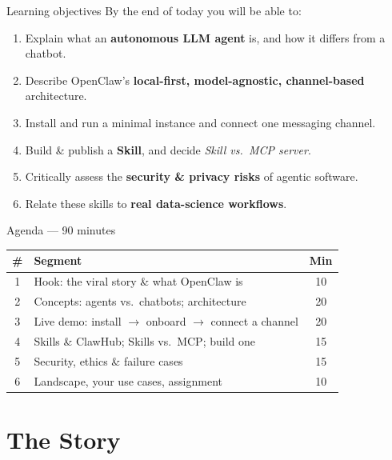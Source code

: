 \documentclass[aspectratio=169,11pt]{beamer}
\begin{document}
\begin{frame}{Learning objectives}
  By the end of today you will be able to:
  \begin{enumerate}
    \item Explain what an \textbf{autonomous LLM agent} is, and how it differs from a chatbot.
    \item Describe OpenClaw's \textbf{local-first, model-agnostic, channel-based} architecture.
    \item Install and run a minimal instance and connect one messaging channel.
    \item Build \& publish a \textbf{Skill}, and decide \emph{Skill vs.\ MCP server}.
    \item Critically assess the \textbf{security \& privacy risks} of agentic software.
    \item Relate these skills to \textbf{real data-science workflows}.
  \end{enumerate}
\end{frame}

\begin{frame}{Agenda — 90 minutes}
  \centering
  \renewcommand{\arraystretch}{1.25}
  \begin{tabular}{c l c}
    \toprule
    \textbf{\#} & \textbf{Segment} & \textbf{Min} \\
    \midrule
    1 & Hook: the viral story \& what OpenClaw is & 10 \\
    2 & Concepts: agents vs.\ chatbots; architecture & 20 \\
    3 & \textcolor{clawOrange}{Live demo}: install $\to$ onboard $\to$ connect a channel & 20 \\
    4 & Skills \& ClawHub; Skills vs.\ MCP; build one & 15 \\
    5 & Security, ethics \& failure cases & 15 \\
    6 & Landscape, your use cases, assignment & 10 \\
    \bottomrule
  \end{tabular}
\end{frame}

\section{The Story}
\end{document}
